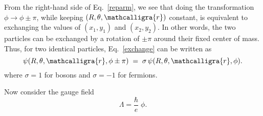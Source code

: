 \documentclass[pra,12pt]{revtex4}
\begin{document}
From the right-hand side of Eq.~\eqref{reparm}, we see that doing the
transformation $\phi \rightarrow \phi \pm \pi$, while keeping $(R,
\theta, \mathcalligra{r})$ constant, is equivalent to exchanging the
values of $(x_1,y_1)$ and $(x_2,y_2)$.  In other words, the two
particles can be exchanged by a rotation of $\pm \pi$ around their
fixed center of mass.  Thus, for two identical particles,
Eq.~\eqref{exchange} can be written as
\begin{equation}
  \psi(R, \theta, \mathcalligra{r}, \phi \pm \pi) \;=\;
  \sigma \, \psi(R, \theta, \mathcalligra{r}, \phi).
\end{equation}
where $\sigma = 1$ for bosons and $\sigma = -1$ for fermions.


Now consider the gauge field
\begin{equation}
  \Lambda = \frac{\hbar}{e}\; \phi.
\end{equation}
\end{document}
